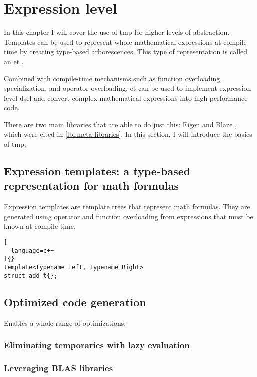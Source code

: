 \documentclass[../main]{subfiles}
\begin{document}
\section{
  Expression level
}
\label{lbl:expression-level-metaprogramming}

In this chapter I will cover the use of \gls{tmp} for higher levels
of abstraction. Templates can be used to represent whole mathematical
expressions at compile time by creating type-based arborescences.
This type of representation is called an \gls{et} \cite{veldhuizen:1995}.

Combined with compile-time mechanisms such as function overloading,
specialization, and operator overloading, \gls{et}\acrpluralsuffix{} can be used to
implement expression level \gls{dsel}\acrpluralsuffix{} and convert complex
mathematical expressions into high performance code.

There are two main libraries that are able to do just this: Eigen \cite{eigen}
and Blaze \cite{blazelib}, which were cited in \ref{lbl:meta-libraries}.
In this section, I will introduce the basics of \cpp \gls{tmp},

\subsection{
  Expression templates: a type-based representation for math formulas
}

Expression templates are template trees that represent math formulas.
They are generated using operator and function overloading from expressions
that must be known at compile time.

\begin{lstlisting}[
  language=c++
]{}
template<typename Left, typename Right>
struct add_t{};
\end{lstlisting}


\subsection{
  Optimized code generation
}

Enables a whole range of optimizations:

\subsubsection{
  Eliminating temporaries with lazy evaluation
}

\subsubsection{
  Leveraging BLAS libraries
}
\end{document}
